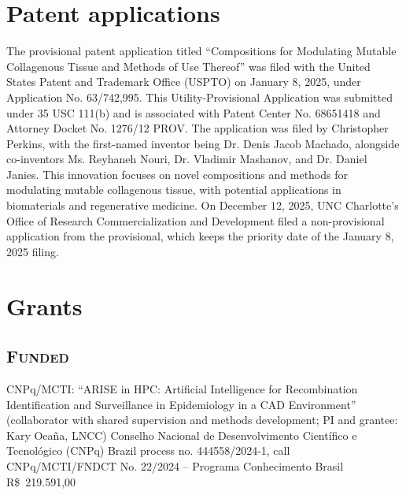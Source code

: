\documentclass[11pt, letterpaper, sans]{moderncv}
\begin{document}

\section{Patent applications}

The provisional patent application titled ``Compositions for Modulating Mutable Collagenous Tissue and Methods of Use Thereof'' was filed with the United States Patent and Trademark Office (USPTO) on January 8, 2025, under Application No. 63/742,995. This Utility-Provisional Application was submitted under 35 USC 111(b) and is associated with Patent Center No. 68651418 and Attorney Docket No. 1276/12 PROV. The application was filed by Christopher Perkins, with the first-named inventor being Dr. Denis Jacob Machado, alongside co-inventors Ms. Reyhaneh Nouri, Dr. Vladimir Mashanov, and Dr. Daniel Janies. This innovation focuses on novel compositions and methods for modulating mutable collagenous tissue, with potential applications in biomaterials and regenerative medicine. On December 12, 2025, UNC Charlotte's Office of Research Commercialization and Development filed a non-provisional application from the provisional, which keeps the priority date of the January 8, 2025 filing.


\section{Grants}


\vspace{.5em}
	\subsection{\textsc{Funded}}
\vspace{.5em}

    {CNPq/MCTI: ``ARISE in HPC: Artificial Intelligence for Recombination Identification and Surveillance in Epidemiology in a CAD Environment'' (collaborator with shared supervision and methods development; PI and grantee: Kary Ocaña, LNCC)}
    {Conselho Nacional de Desenvolvimento Científico e Tecnológico (CNPq)}
    {Brazil}
    {process no. 444558/2024-1, call CNPq/MCTI/FNDCT No. 22/2024 -- Programa Conhecimento Brasil}
    {R\$~219.591,00}
\end{document}
